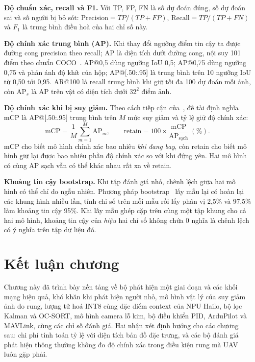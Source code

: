 \textbf{Độ chuẩn xác, recall và F1.} Với TP, FP, FN là số dự đoán đúng, số dự đoán sai và số người bị bỏ sót: $\mathrm{Precision} = TP/(TP+FP)$, $\mathrm{Recall} = TP/(TP+FN)$ và $F_1$ là trung bình điều hoà của hai chỉ số này.

\textbf{Độ chính xác trung bình (AP).} Khi thay đổi ngưỡng điểm tin cậy ta được đường cong precision theo recall; AP là diện tích dưới đường cong, nội suy 101 điểm theo chuẩn COCO~\cite{lin2014coco,padilla2021metrics}. AP@0,5 dùng ngưỡng IoU 0,5; AP@0,75 dùng ngưỡng 0,75 và phản ánh độ khít của hộp; AP@[.50:.95] là trung bình trên 10 ngưỡng IoU từ 0,50 tới 0,95. AR@100 là recall trung bình khi giữ tối đa 100 dự đoán mỗi ảnh, còn AP$_s$ là AP trên vật có diện tích dưới $32^2$ điểm ảnh.

\textbf{Độ chính xác khi bị suy giảm.} Theo cách tiếp cận của~\cite{hendrycks2019imagenetc}, đề tài định nghĩa mCP là AP@[.50:.95] trung bình trên $M$ mức suy giảm và tỷ lệ giữ độ chính xác:
\begin{equation}
\mathrm{mCP} = \frac{1}{M}\sum_{m=1}^{M} \mathrm{AP}_m, \qquad
\mathrm{retain} = 100 \times \frac{\mathrm{mCP}}{\mathrm{AP}_{\text{sạch}}}\ (\%).
\label{eq:mcp}
\end{equation}
mCP cho biết mô hình chính xác bao nhiêu \textit{khi đang bay}, còn retain cho biết mô hình giữ lại được bao nhiêu phần độ chính xác so với khi đứng yên. Hai mô hình có cùng AP sạch vẫn có thể khác nhau rất xa về retain.

\textbf{Khoảng tin cậy bootstrap.} Khi tập đánh giá nhỏ, chênh lệch giữa hai mô hình có thể chỉ do ngẫu nhiên. Phương pháp bootstrap~\cite{efron1979bootstrap} lấy mẫu lại có hoàn lại các khung hình nhiều lần, tính chỉ số trên mỗi mẫu rồi lấy phân vị 2,5\% và 97,5\% làm khoảng tin cậy 95\%. Khi lấy mẫu ghép cặp trên cùng một tập khung cho cả hai mô hình, khoảng tin cậy của \textit{hiệu} hai chỉ số không chứa 0 nghĩa là chênh lệch có ý nghĩa trên tập dữ liệu đó.

\section{Kết luận chương}

Chương này đã trình bày nền tảng về bộ phát hiện một giai đoạn và các khối mạng hiệu quả, khó khăn khi phát hiện người nhỏ, mô hình vật lý của suy giảm ảnh do rung, lượng tử hoá INT8 cùng đặc điểm context của NPU Hailo, bộ lọc Kalman và OC-SORT, mô hình camera lỗ kim, bộ điều khiển PID, ArduPilot và MAVLink, cùng các chỉ số đánh giá. Hai nhận xét định hướng cho các chương sau: chi phí tính toán tỷ lệ với diện tích bản đồ đặc trưng, và các bộ đánh giá phát hiện thông thường không đo độ chính xác trong điều kiện rung mà UAV luôn gặp phải.
